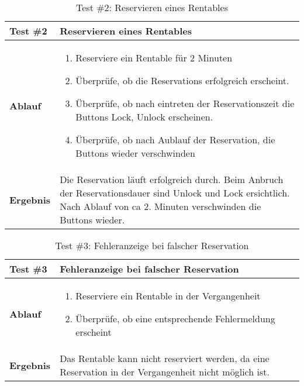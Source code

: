 \begin{table}[H]
\centering
\caption{Test \#2: Reservieren eines Rentables }
\label{my-label}
\begin{tabular}{@{}L{1.6cm}L{11cm}@{}}
\toprule
\textbf{Test \#2}
& Reservieren eines Rentables
\\ \midrule
\textbf{Ablauf}
& 
\begin{enumerate}
    \item Reserviere ein Rentable für 2 Minuten
    \item Überprüfe, ob die Reservations erfolgreich erscheint.
    \item Überprüfe, ob nach eintreten der Reservationszeit die Buttons Lock, Unlock erscheinen.
    \item Überprüfe, ob nach Aublauf der Reservation, die Buttons wieder verschwinden
\end{enumerate}
\\ \midrule
\textbf{Ergebnis}
& Die Reservation läuft erfolgreich durch. Beim Anbruch der Reservationsdauer sind Unlock und Lock ersichtlich. Nach Ablauf von ca 2. Minuten verschwinden die Buttons wieder. 
\\ \bottomrule
\end{tabular}
\end{table}


\begin{table}[H]
\centering
\caption{Test \#3: Fehleranzeige bei falscher Reservation}
\label{my-label}
\begin{tabular}{@{}L{1.6cm}L{11cm}@{}}
\toprule
\textbf{Test \#3}
& Fehleranzeige bei falscher Reservation
\\ \midrule
\textbf{Ablauf}
& 
\begin{enumerate}
    \item Reserviere ein Rentable in der Vergangenheit
    \item Überprüfe, ob eine entsprechende Fehlermeldung erscheint
\end{enumerate}
\\ \midrule
\textbf{Ergebnis}
& Das Rentable kann nicht reserviert werden, da eine Reservation in der Vergangenheit nicht möglich ist. 
\\ \bottomrule
\end{tabular}
\end{table}

